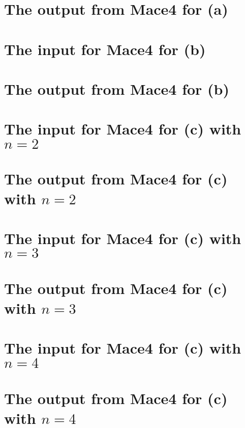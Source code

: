 \begin{appendices}
\chapter{The output from Mace4 for (a)}
\label{app:3_a2_out}


\chapter{The input for Mace4 for (b)}
\label{app:3_b_in}


\chapter{The output from Mace4 for (b)}
\label{app:3_b_out}


\chapter{The input for Mace4 for (c) with \texorpdfstring{$n = 2$}{n2}}
\label{app:3_c2_in}


\chapter{The output from Mace4 for (c) with \texorpdfstring{$n = 2$}{n2}}
\label{app:3_c2_out}


\chapter{The input for Mace4 for (c) with \texorpdfstring{$n = 3$}{n3}}
\label{app:3_c3_in}


\chapter{The output from Mace4 for (c) with \texorpdfstring{$n = 3$}{n3}}
\label{app:3_c3_out}


\chapter{The input for Mace4 for (c) with \texorpdfstring{$n = 4$}{n4}}
\label{app:3_c4_in}


\chapter{The output from Mace4 for (c) with \texorpdfstring{$n = 4$}{n4}}
\label{app:3_c4_out}



\end{appendices}
